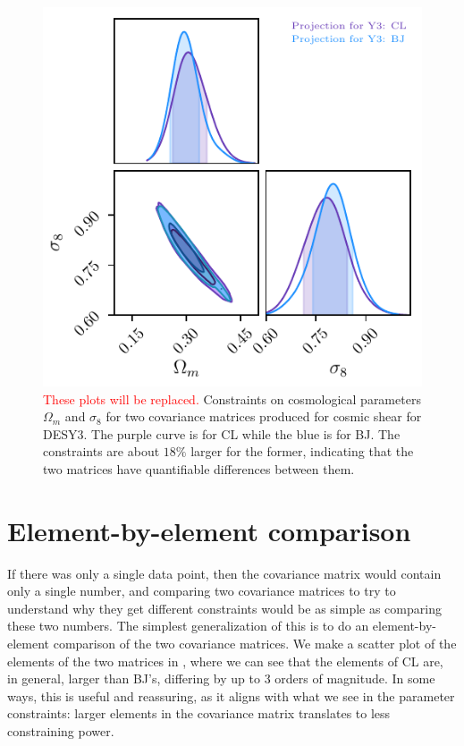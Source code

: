 \documentclass[twocolumn]{\docclass}
\begin{document}
	\begin{figure}
		\includegraphics[width=0.9\columnwidth]{Y3-comparison.pdf}
		\caption{\textcolor{red}{These plots will be replaced.} Constraints on cosmological parameters $\Omega_m$ and $\sigma_8$ for two covariance matrices produced for cosmic shear for DESY3. The purple curve is for CL while the blue is for BJ. The constraints are about $18\%$ larger for the former, indicating that the two matrices have quantifiable differences between them. \label{fig:y3-comparison}}
	\end{figure}
	

	
\section{Element-by-element comparison}

	If there was only a single data point, then the covariance matrix would contain only a single number, and comparing two covariance matrices to try to understand why they get different constraints would be as simple as comparing these two numbers. 
The simplest generalization of this is to do an element-by-element comparison of the two covariance matrices.
We make a scatter plot of the elements of the two matrices in , where we can see that the elements of CL are, in general, larger than BJ's, differing by up to 3 orders of magnitude. In some ways, this is useful and reassuring, as it aligns with what we see in the parameter constraints: larger elements in the covariance matrix translates to less constraining power.
	
\end{document}
